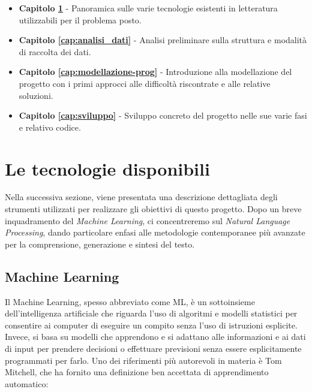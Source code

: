 \documentclass[12pt,a4paper,twoside,openright]{book}
\begin{document}
\begin{itemize}
    \item \textbf{Capitolo \ref{cap:tecnologie}} - Panoramica sulle varie tecnologie esistenti in letteratura utilizzabili per il problema posto.
    \item \textbf{Capitolo \ref{cap:analisi_dati}} - Analisi preliminare sulla struttura e modalità di raccolta dei dati.
    \item \textbf{Capitolo \ref{cap:modellazione-prog}} - Introduzione alla modellazione del progetto con i primi approcci alle difficoltà riscontrate e alle relative soluzioni.
    \item \textbf{Capitolo \ref{cap:sviluppo}} - Sviluppo concreto del progetto nelle sue varie fasi e relativo codice.
\end{itemize}






































\chapter{Le tecnologie disponibili}
\label{cap:tecnologie}

Nella successiva sezione, viene presentata una descrizione dettagliata degli strumenti utilizzati per realizzare gli obiettivi di questo progetto. Dopo un breve inquadramento del \emph{Machine Learning}, ci concentreremo sul \emph{Natural Language Processing}, dando particolare enfasi alle metodologie contemporanee più avanzate per la comprensione, generazione e sintesi del testo.

\section{Machine Learning}
Il Machine Learning, spesso abbreviato come ML, è un sottoinsieme dell'intelligenza artificiale che riguarda l'uso di algoritmi e modelli statistici per consentire ai computer di eseguire un compito senza l'uso di istruzioni esplicite. Invece, si basa su modelli che apprendono e si adattano alle informazioni e ai dati di input per prendere decisioni o effettuare previsioni senza essere esplicitamente programmati per farlo.
Uno dei riferimenti più autorevoli in materia è Tom Mitchell, che ha fornito una definizione ben accettata di apprendimento automatico\cite{DBLP:books/daglib/0087929}:
\end{document}
